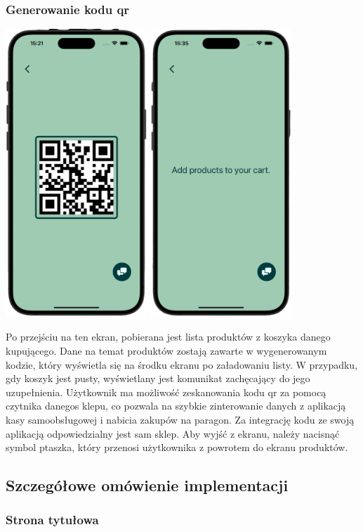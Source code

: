 \subsubsection{Generowanie kodu qr}
\begin{center}
    \includegraphics[width=0.4\textwidth]{images/front/qr_page.png}
    \includegraphics[width=0.4\textwidth]{images/front/qr_empty.png}
\end{center}

Po przejściu na ten ekran, pobierana jest lista produktów z koszyka danego kupującego. Dane na temat produktów zostają zawarte w wygenerowanym kodzie, który wyświetla się na środku ekranu po załadowaniu listy. W przypadku, gdy koszyk jest pusty, wyświetlany jest komunikat zachęcający do jego uzupełnienia. Użytkownik ma możliwość zeskanowania kodu qr za pomocą czytnika danegos klepu, co pozwala na szybkie zinterowanie danych z aplikacją kasy samoobsługowej i nabicia zakupów na paragon. Za integrację kodu ze swoją aplikacją odpowiedzialny jest sam sklep. Aby wyjść z ekranu, należy nacisnąć symbol ptaszka, który przenosi użytkownika z powrotem do ekranu produktów.

\subsection{Szczegółowe omówienie implementacji}
\subsubsection{Strona tytułowa}


